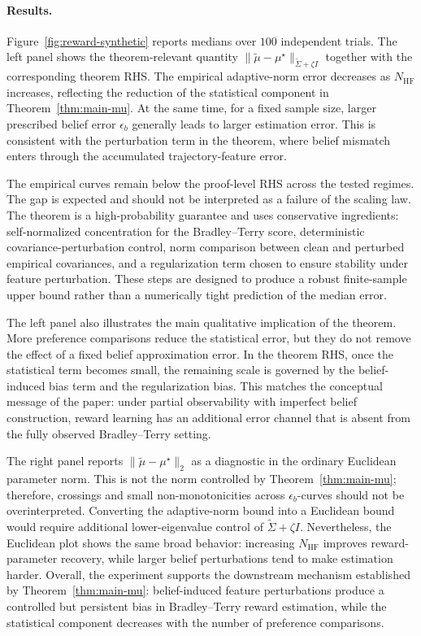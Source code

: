 \documentclass[10pt]{article} %
\theoremstyle{plain}
\theoremstyle{definition}
\theoremstyle{remark}
\begin{document}
\paragraph{Results.}
Figure~\ref{fig:reward-synthetic} reports medians over \(100\) independent trials. The left panel shows the theorem-relevant quantity
\(\|\tilde\mu-\mu^\star\|_{\tilde\Sigma+\zeta I}\) together with the corresponding theorem RHS. The empirical adaptive-norm error decreases as \(N_{\mathrm{HF}}\) increases, reflecting the reduction of the statistical component in Theorem~\ref{thm:main-mu}. At the same time, for a fixed sample size, larger prescribed belief error \(\epsilon_b\) generally leads to larger estimation error. This is consistent with the perturbation term in the theorem, where belief mismatch enters through the accumulated trajectory-feature error.

The empirical curves remain below the proof-level RHS across the tested regimes. The gap is expected and should not be interpreted as a failure of the scaling law. The theorem is a high-probability guarantee and uses conservative ingredients: self-normalized concentration for the Bradley--Terry score, deterministic covariance-perturbation control, norm comparison between clean and perturbed empirical covariances, and a regularization term chosen to ensure stability under feature perturbation. These steps are designed to produce a robust finite-sample upper bound rather than a numerically tight prediction of the median error.

The left panel also illustrates the main qualitative implication of the theorem. More preference comparisons reduce the statistical error, but they do not remove the effect of a fixed belief approximation error. In the theorem RHS, once the statistical term becomes small, the remaining scale is governed by the belief-induced bias term and the regularization bias. This matches the conceptual message of the paper: under partial observability with imperfect belief construction, reward learning has an additional error channel that is absent from the fully observed Bradley--Terry setting.

The right panel reports \(\|\tilde\mu-\mu^\star\|_2\) as a diagnostic in the ordinary Euclidean parameter norm. This is not the norm controlled by Theorem~\ref{thm:main-mu}; therefore, crossings and small non-monotonicities across \(\epsilon_b\)-curves should not be overinterpreted. Converting the adaptive-norm bound into a Euclidean bound would require additional lower-eigenvalue control of \(\tilde\Sigma+\zeta I\). Nevertheless, the Euclidean plot shows the same broad behavior: increasing \(N_{\mathrm{HF}}\) improves reward-parameter recovery, while larger belief perturbations tend to make estimation harder. Overall, the experiment supports the downstream mechanism established by Theorem~\ref{thm:main-mu}: belief-induced feature perturbations produce a controlled but persistent bias in Bradley--Terry reward estimation, while the statistical component decreases with the number of preference comparisons.
\end{document}
